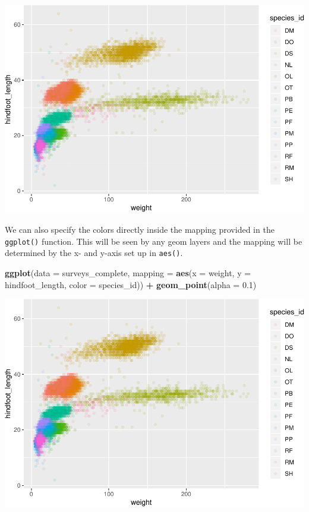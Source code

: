 \documentclass[]{book}
\newenvironment{Shaded}{\begin{snugshade}}{\end{snugshade}}
\newcommand{\KeywordTok}[1]{\textcolor[rgb]{0.13,0.29,0.53}{\textbf{#1}}}
\newcommand{\DataTypeTok}[1]{\textcolor[rgb]{0.13,0.29,0.53}{#1}}
\newcommand{\FloatTok}[1]{\textcolor[rgb]{0.00,0.00,0.81}{#1}}
\newcommand{\StringTok}[1]{\textcolor[rgb]{0.31,0.60,0.02}{#1}}
\newcommand{\OperatorTok}[1]{\textcolor[rgb]{0.81,0.36,0.00}{\textbf{#1}}}
\newcommand{\NormalTok}[1]{#1}
\begin{document}
\includegraphics{img/R-ecology-color-1.pdf}

We can also specify the colors directly inside the mapping provided in
the \texttt{ggplot()} function. This will be seen by any geom layers and
the mapping will be determined by the x- and y-axis set up in
\texttt{aes()}.

\begin{Shaded}
\begin{Highlighting}[]
\KeywordTok{ggplot}\NormalTok{(}\DataTypeTok{data =}\NormalTok{ surveys_complete, }\DataTypeTok{mapping =} \KeywordTok{aes}\NormalTok{(}\DataTypeTok{x =}\NormalTok{ weight, }\DataTypeTok{y =}\NormalTok{ hindfoot_length, }\DataTypeTok{color =}\NormalTok{ species_id)) }\OperatorTok{+}
\StringTok{    }\KeywordTok{geom_point}\NormalTok{(}\DataTypeTok{alpha =} \FloatTok{0.1}\NormalTok{)}
\end{Highlighting}
\end{Shaded}

\includegraphics{img/R-ecology-color-by-species1-1.pdf}
\end{document}
